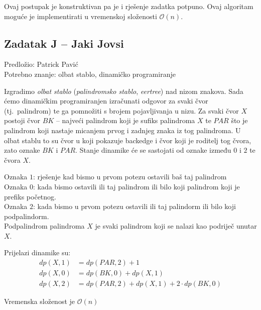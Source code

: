 \documentclass[a4paper]{article}
\begin{document}
Ovaj postupak je konstruktivan pa je i rješenje zadatka potpuno. Ovaj algoritam
moguće je implementirati u vremenskoj složenosti $\mathcal{O}(n)$.

\subsection*{Zadatak J -- Jaki Jovsi}
\textsf{Predložio: Patrick Pavić}\\
\textsf{Potrebno znanje: olbat stablo, dinamičko programiranje}

Izgradimo \textit{olbat stablo} (\textit{palindromsko stablo}, \textit{eertree})
nad nizom znakova. Sada ćemo dinamičkim programiranjen izračunati odgovor za
svaki čvor (tj.\ palindrom) te ga pomnožiti s brojem pojavljivanja u nizu.
Za svaki čvor $X$ postoji čvor $BK$ -- najveći palindrom koji je sufiks
palindroma $X$ te $PAR$ što je palindrom koji nastaje micanjem prvog i zadnjeg
znaka iz tog palindroma. U olbat stablu to su čvor u koji pokazuje backedge i
čvor koji je roditelj tog čvora, zato oznake $BK$ i $PAR$. Stanje dinamike će 
se sastojati od oznake između $0$ i $2$ te čvora $X$.

Oznaka $1$: rješenje kad bismo u prvom potezu ostavili baš taj palindrom\\
Oznaka $0$: kada bismo ostavili ili taj palindrom ili bilo koji palindrom koji je prefiks početnog.\\
Oznaka $2$: kada bismo u prvom potezu ostavili ili taj palindorm ili bilo koji podpalindorm.\\

Podpalindrom palindroma $X$ je svaki palindrom koji se nalazi kao podriječ unutar $X$.

Prijelazi dinamike su:
\begin{align*}
  dp(X, 1) &= dp(PAR, 2) + 1 \\
  dp(X, 0) &= dp(BK, 0) + dp(X, 1) \\
  dp(X, 2) &= dp(PAR, 2) + dp(X, 1) + 2 \cdot dp(BK, 0)
\end{align*}

Vremenska složenost je $\mathcal{O}(n)$
\end{document}
